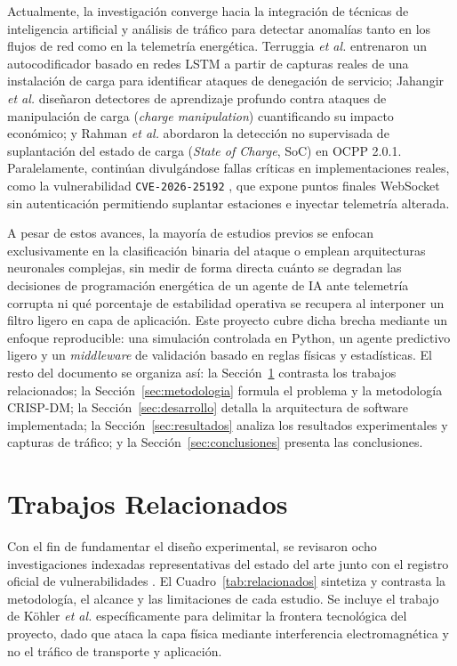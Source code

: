 \documentclass[conference]{IEEEtran}
\begin{document}
Actualmente, la investigación converge hacia la integración de técnicas de inteligencia artificial y análisis de tráfico para detectar anomalías tanto en los flujos de red como en la telemetría energética. Terruggia \textit{et al.} \cite{terruggia2025} entrenaron un autocodificador basado en redes LSTM a partir de capturas reales de una instalación de carga para identificar ataques de denegación de servicio; Jahangir \textit{et al.} \cite{jahangir2024} diseñaron detectores de aprendizaje profundo contra ataques de manipulación de carga (\textit{charge manipulation}) cuantificando su impacto económico; y Rahman \textit{et al.} \cite{rahman2026} abordaron la detección no supervisada de suplantación del estado de carga (\textit{State of Charge}, SoC) en OCPP 2.0.1. Paralelamente, continúan divulgándose fallas críticas en implementaciones reales, como la vulnerabilidad \texttt{CVE-2026-25192} \cite{nist2026}, que expone puntos finales WebSocket sin autenticación permitiendo suplantar estaciones e inyectar telemetría alterada.

A pesar de estos avances, la mayoría de estudios previos se enfocan exclusivamente en la clasificación binaria del ataque o emplean arquitecturas neuronales complejas, sin medir de forma directa cuánto se degradan las decisiones de programación energética de un agente de IA ante telemetría corrupta ni qué porcentaje de estabilidad operativa se recupera al interponer un filtro ligero en capa de aplicación. Este proyecto cubre dicha brecha mediante un enfoque reproducible: una simulación controlada en Python, un agente predictivo ligero y un \textit{middleware} de validación basado en reglas físicas y estadísticas. El resto del documento se organiza así: la Sección~\ref{sec:trabajos} contrasta los trabajos relacionados; la Sección~\ref{sec:metodologia} formula el problema y la metodología CRISP-DM; la Sección~\ref{sec:desarrollo} detalla la arquitectura de software implementada; la Sección~\ref{sec:resultados} analiza los resultados experimentales y capturas de tráfico; y la Sección~\ref{sec:conclusiones} presenta las conclusiones.

\section{Trabajos Relacionados}
\label{sec:trabajos}

Con el fin de fundamentar el diseño experimental, se revisaron ocho investigaciones indexadas representativas del estado del arte junto con el registro oficial de vulnerabilidades \cite{nist2026}. El Cuadro~\ref{tab:relacionados} sintetiza y contrasta la metodología, el alcance y las limitaciones de cada estudio. Se incluye el trabajo de Köhler \textit{et al.} \cite{kohler2023} específicamente para delimitar la frontera tecnológica del proyecto, dado que ataca la capa física mediante interferencia electromagnética y no el tráfico de transporte y aplicación.
\end{document}
